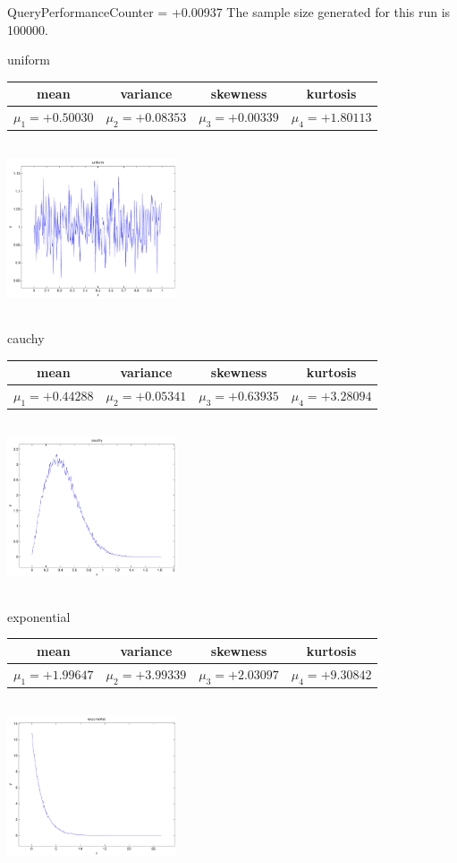 \documentclass[9pt]{article}
\theoremstyle{plain}
\theoremstyle{definition}
\theoremstyle{remark}
\numberwithin{equation}{section}
\begin{document}
QueryPerformanceCounter  =  +0.00937
The sample size generated for this run is 100000.

\newpage
uniform \begin{tabular}{|c|c|c|c|}  mean & variance & skewness & kurtosis \\  \hline
$\mu_1 = +0.50030$ & $\mu_2 = +0.08353$ & $\mu_3 = +0.00339$ & $\mu_4 =+1.80113$ \\
\end{tabular}

\includegraphics[width=5cm,height=5cm]{uniform.pdf}

cauchy \begin{tabular}{|c|c|c|c|}  mean & variance & skewness & kurtosis \\  \hline
$\mu_1 = +0.44288$ & $\mu_2 = +0.05341$ & $\mu_3 = +0.63935$ & $\mu_4 =+3.28094$ \\
\end{tabular}

\includegraphics[width=5cm,height=5cm]{cauchy.pdf}

exponential \begin{tabular}{|c|c|c|c|}  mean & variance & skewness & kurtosis \\  \hline
$\mu_1 = +1.99647$ & $\mu_2 = +3.99339$ & $\mu_3 = +2.03097$ & $\mu_4 =+9.30842$ \\
\end{tabular}

\includegraphics[width=5cm,height=5cm]{exponential.pdf}
\end{document}
